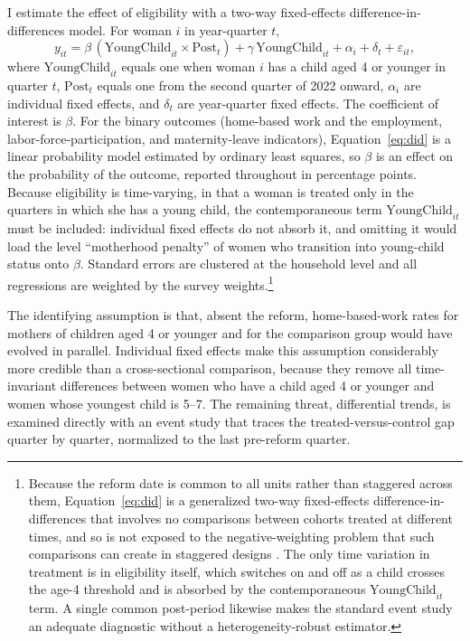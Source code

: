 \documentclass[12pt]{article}
\begin{document}
I estimate the effect of eligibility with a two-way fixed-effects difference-in-differences model. For woman $i$ in year-quarter $t$,
%
\begin{equation}
y_{it} = \beta\,(\text{YoungChild}_{it}\times \text{Post}_t) + \gamma\,\text{YoungChild}_{it} + \alpha_i + \delta_t + \varepsilon_{it},
\label{eq:did}
\end{equation}
%
where $\text{YoungChild}_{it}$ equals one when woman $i$ has a child aged 4 or younger in quarter $t$, $\text{Post}_t$ equals one from the second quarter of 2022 onward, $\alpha_i$ are individual fixed effects, and $\delta_t$ are year-quarter fixed effects. The coefficient of interest is $\beta$. For the binary outcomes (home-based work and the employment, labor-force-participation, and maternity-leave indicators), Equation~\eqref{eq:did} is a linear probability model estimated by ordinary least squares, so $\beta$ is an effect on the probability of the outcome, reported throughout in percentage points. Because eligibility is time-varying, in that a woman is treated only in the quarters in which she has a young child, the contemporaneous term $\text{YoungChild}_{it}$ must be included: individual fixed effects do not absorb it, and omitting it would load the level ``motherhood penalty'' of women who transition into young-child status onto $\beta$. Standard errors are clustered at the household level and all regressions are weighted by the survey weights.\footnote{Because the reform date is common to all units rather than staggered across them, Equation~\eqref{eq:did} is a generalized two-way fixed-effects difference-in-differences that involves no comparisons between cohorts treated at different times, and so is not exposed to the negative-weighting problem that such comparisons can create in staggered designs \citep{goodmanbacon2021,dechaisemartin2020}. The only time variation in treatment is in eligibility itself, which switches on and off as a child crosses the age-4 threshold and is absorbed by the contemporaneous $\text{YoungChild}_{it}$ term. A single common post-period likewise makes the standard event study an adequate diagnostic without a heterogeneity-robust estimator.}

The identifying assumption is that, absent the reform, home-based-work rates for mothers of children aged 4 or younger and for the comparison group would have evolved in parallel. Individual fixed effects make this assumption considerably more credible than a cross-sectional comparison, because they remove all time-invariant differences between women who have a child aged 4 or younger and women whose youngest child is 5--7. The remaining threat, differential trends, is examined directly with an event study that traces the treated-versus-control gap quarter by quarter, normalized to the last pre-reform quarter.
\end{document}
